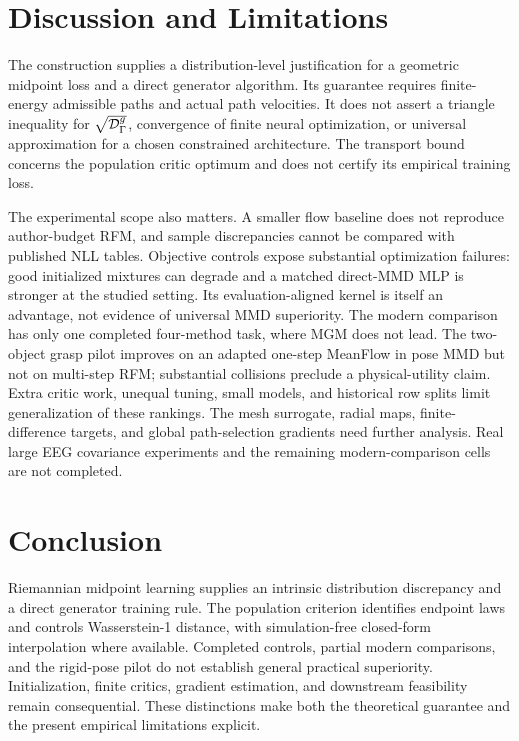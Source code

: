 \section{Discussion and Limitations}
The construction supplies a distribution-level justification for a geometric midpoint loss and a direct generator algorithm. Its guarantee requires finite-energy admissible paths and actual path velocities. It does not assert a triangle inequality for $\sqrt{\mathcal D_\Gamma^g}$, convergence of finite neural optimization, or universal approximation for a chosen constrained architecture. The transport bound concerns the population critic optimum and does not certify its empirical training loss.

The experimental scope also matters. A smaller flow baseline does not reproduce author-budget RFM, and sample discrepancies cannot be compared with published NLL tables. Objective controls expose substantial optimization failures: good initialized mixtures can degrade and a matched direct-MMD MLP is stronger at the studied setting. Its evaluation-aligned kernel is itself an advantage, not evidence of universal MMD superiority. The modern comparison has only one completed four-method task, where MGM does not lead. The two-object grasp pilot improves on an adapted one-step MeanFlow in pose MMD but not on multi-step RFM; substantial collisions preclude a physical-utility claim. Extra critic work, unequal tuning, small models, and historical row splits limit generalization of these rankings. The mesh surrogate, radial maps, finite-difference targets, and global path-selection gradients need further analysis. Real large EEG covariance experiments and the remaining modern-comparison cells are not completed.

\section{Conclusion}
Riemannian midpoint learning supplies an intrinsic distribution discrepancy and a direct generator training rule. The population criterion identifies endpoint laws and controls Wasserstein-1 distance, with simulation-free closed-form interpolation where available. Completed controls, partial modern comparisons, and the rigid-pose pilot do not establish general practical superiority. Initialization, finite critics, gradient estimation, and downstream feasibility remain consequential. These distinctions make both the theoretical guarantee and the present empirical limitations explicit.
